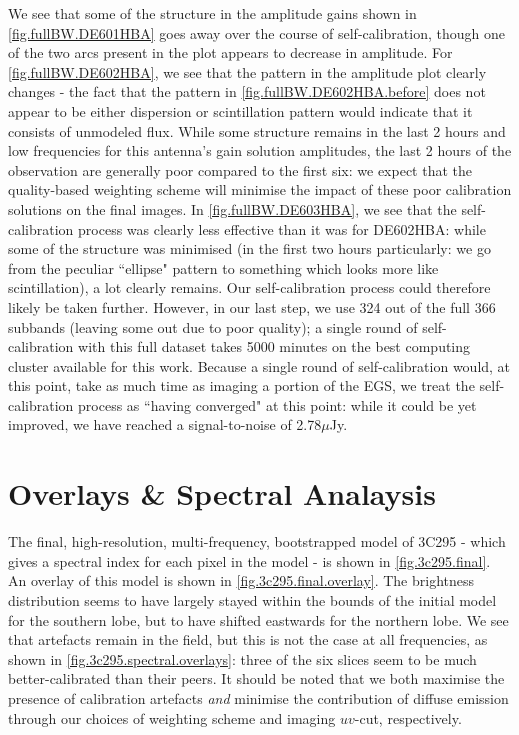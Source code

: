 \pg
We see that some of the structure in the amplitude gains shown in \cref{fig.fullBW.DE601HBA} goes away over the course of self-calibration, though one of the two arcs present in the plot appears to decrease in amplitude. For \cref{fig.fullBW.DE602HBA}, we see that the pattern in the amplitude plot clearly changes - the fact that the pattern in \cref{fig.fullBW.DE602HBA.before} does not appear to be either dispersion or scintillation pattern would indicate that it consists of unmodeled flux. While some structure remains in the last 2 hours and low frequencies for this antenna's gain solution amplitudes, the last 2 hours of the observation are generally poor compared to the first six: we expect that the quality-based weighting scheme will minimise the impact of these poor calibration solutions on the final images. In \cref{fig.fullBW.DE603HBA}, we see that the self-calibration process was clearly less effective than it was for DE602HBA: while some of the structure was minimised (in the first two hours particularly: we go from the peculiar ``ellipse" pattern to something which looks more like scintillation), a lot clearly remains. Our self-calibration process could therefore likely be taken further. However, in our last step, we use 324 out of the full 366 subbands (leaving some out due to poor quality); a single round of self-calibration with this full dataset takes 5000 minutes on the best computing cluster available for this work. Because a single round of self-calibration would, at this point, take as much time as imaging a portion of the EGS, we treat the self-calibration process as ``having converged" at this point: while it could be yet improved, we have reached a signal-to-noise of 2.78$\mu$Jy. 


\clearpage
\section{Overlays \& Spectral Analaysis}

\pg
The final, high-resolution, multi-frequency, bootstrapped model of 3C295 - which gives a spectral index for each pixel in the model - is shown in \cref{fig.3c295.final}. An overlay of this model is shown in \cref{fig.3c295.final.overlay}. The brightness distribution seems to have largely stayed within the bounds of the initial model for the southern lobe, but to have shifted eastwards for the northern lobe. We see that artefacts remain in the field, but this is not the case at all frequencies, as shown in \cref{fig.3c295.spectral.overlays}: three of the six slices seem to be much better-calibrated than their peers. It should be noted that we both maximise the presence of calibration artefacts \textit{and} minimise the contribution of diffuse emission through our choices of weighting scheme and imaging $uv$-cut, respectively.


